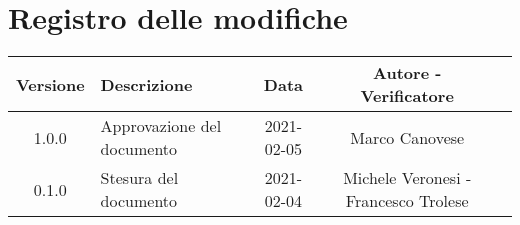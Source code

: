 \section*{Registro delle modifiche}

\begin{center}
	\begin{longtable}{|c|p{5cm}|c|c|c|}
		\hline
		\rowcolor{lighter-grayer}
		\textbf{Versione} & \textbf{Descrizione} & \textbf{Data} & \textbf{Autore - Verificatore} \\
		\hline
		\endfirsthead


		\hline
		1.0.0 & Approvazione del documento & 2021-02-05 & Marco Canovese \\
		0.1.0 & Stesura del documento & 2021-02-04 & Michele Veronesi - Francesco Trolese \\
		\hline
	\end{longtable}
\end{center}